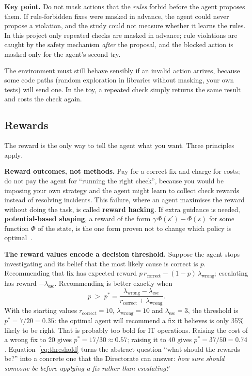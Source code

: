 \documentclass[11pt,a4paper]{article}
\newcommand{\keypoint}[1]{\par\noindent\colorbox{notebg}{\parbox{\dimexpr\linewidth-2\fboxsep}{\small\textbf{Key point.} #1}}\par}
\begin{document}
\keypoint{Do not mask actions that the \emph{rules} forbid before the agent proposes them. If rule-forbidden fixes were masked in advance, the agent could never propose a violation, and the study could not measure whether it learns the rules. In this project only repeated checks are masked in advance; rule violations are caught by the safety mechanism \emph{after} the proposal, and the blocked action is masked only for the agent's second try.}

The environment must still behave sensibly if an invalid action arrives, because some code paths (random exploration in libraries without masking, your own tests) will send one. In the toy, a repeated check simply returns the same result and costs the check again.

\subsection{Rewards}
The reward is the only way to tell the agent what you want. Three principles apply.

\textbf{Reward outcomes, not methods.} Pay for a correct fix and charge for costs; do not pay the agent for ``running the right check'', because you would be imposing your own strategy and the agent might learn to collect check rewards instead of resolving incidents. This failure, where an agent maximises the reward without doing the task, is called \textbf{reward hacking}. If extra guidance is needed, \textbf{potential-based shaping}, a reward of the form $\gamma\,\Phi(s') - \Phi(s)$ for some function $\Phi$ of the state, is the one form proven not to change which policy is optimal~\cite{ng}.

\textbf{The reward values encode a decision threshold.} Suppose the agent stops investigating and its belief that the most likely cause is correct is $p$. Recommending that fix has expected reward $p\, r_{\text{correct}} - (1-p)\,\lambda_{\text{wrong}}$; escalating has reward $-\lambda_{\text{esc}}$. Recommending is better exactly when
\begin{equation}
p \;>\; p^* = \frac{\lambda_{\text{wrong}} - \lambda_{\text{esc}}}{r_{\text{correct}} + \lambda_{\text{wrong}}}.
\label{eq:threshold}
\end{equation}
With the starting values $r_{\text{correct}} = 10$, $\lambda_{\text{wrong}} = 10$ and $\lambda_{\text{esc}} = 3$, the threshold is $p^* = 7/20 = 0.35$: the optimal agent will recommend a fix it believes is only 35\% likely to be right. That is probably too bold for IT operations. Raising the cost of a wrong fix to 20 gives $p^* = 17/30 \approx 0.57$; raising it to 40 gives $p^* = 37/50 = 0.74$. Equation~\eqref{eq:threshold} turns the abstract question ``what should the rewards be?'' into a concrete one that the Directorate can answer: \emph{how sure should someone be before applying a fix rather than escalating?}
\end{document}
